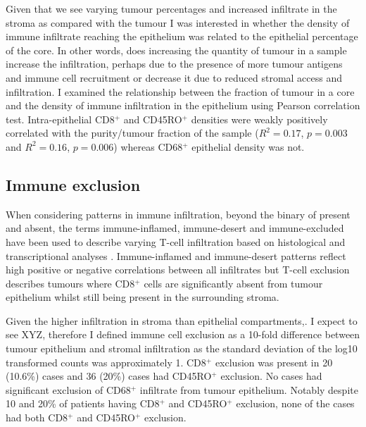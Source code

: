 Given that we see varying tumour percentages and increased infiltrate in the stroma as compared with the tumour I was interested in whether the density of immune infiltrate reaching the epithelium was related to the epithelial percentage of the core. In  other words, does increasing the quantity of tumour in a sample increase the infiltration, perhaps due to the presence of more tumour antigens and immune cell recruitment or decrease it due to reduced stromal access and infiltration. I examined the relationship between the fraction of tumour in a core and the density of immune infiltration in the epithelium using Pearson correlation test. Intra-epithelial CD8$^+$ and CD45RO$^+$ densities were  weakly positively correlated with the purity/tumour fraction of the sample ($R^2 = 0.17$, $p = 0.003$ and $R^2 = 0.16$, $p=0.006$) whereas CD68$^+$ epithelial density was not.



\subsection{Immune exclusion}

When considering patterns in immune infiltration, beyond the binary of present and absent, the terms immune-inflamed, immune-desert and immune-excluded have been used to describe varying T-cell infiltration based on histological and transcriptional analyses \cite{}. Immune-inflamed and immune-desert patterns reflect high positive or negative correlations between all infiltrates but T-cell exclusion describes tumours where CD8$^+$ cells are significantly absent from tumour epithelium whilst still being present in the surrounding stroma\cite{26,27}. 

Given the higher infiltration in stroma than epithelial compartments,. I expect to see XYZ, therefore I defined immune cell exclusion as a 10-fold difference between tumour epithelium and stromal infiltration as the standard deviation of the log10 transformed counts was approximately 1. CD8$^+$ exclusion was present in 20 (10.6\%) cases and 36 (20\%) cases had CD45RO$^+$ exclusion. No cases had significant exclusion of CD68$^+$ infiltrate from tumour epithelium.  Notably despite 10 and 20\% of patients having CD8$^+$ and CD45RO$^+$ exclusion, none of the cases had both CD8$^+$ and CD45RO$^+$ exclusion. %



